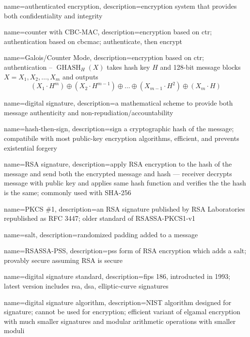 {
    name={authenticated encryption},
    description={encryption system that provides both \gls{confidentiality} and \gls{integrity}}
}

{
    name={counter with CBC-MAC},
    description={encryption based on \acrfull{ctr}; authentication based on \gls{cbcmac}; authenticate, then encrypt}
}

{
    name={Galois/Counter Mode},
    description={encryption based on \acrfull{ctr}; authentication -- $\operatorname{GHASH}_H(X)$ takes hash key $H$ and 128-bit message blocks $X = X_1, X_2, \dots, X_m$ and outputs \[(X_1\cdot H^m)\oplus(X_2\cdot H^{m-1})\oplus\dots\oplus(X_{m-1}\cdot H^2)\oplus(X_m\cdot H)\]}
}

{
    name={digital signature},
    description={a mathematical scheme to provide both message \gls{authenticity} and \gls{non-repudiation}/\gls{accountability}}
}

{
    name={hash-then-sign},
    description={sign a cryptographic hash of the message; compatibile with most public-key encryption algorithms, efficient, and prevents existential forgery}
}

{
    name={RSA signature},
    description={apply RSA encryption to the hash of the message and send both the encrypted message and hash --- receiver decrypts message with public key and applies same hash function and verifies the the hash is the same; commonly used with SHA-256}
}

{
    name={PKCS \#1},
    description={an RSA signature published by RSA Laboratories republished as RFC 3447; older standard of RSASSA-PKCS1-v1}
}

{
    name={salt},
    description={randomized padding added to a message}
}

{
    name={RSASSA-PSS},
    description={\acrfull{pss} form of RSA encryption which adds a \gls{salt}; provably secure assuming RSA is secure}
}

{
    name={digital signature standard},
    description={\acrfull{fips} 186, introducted in 1993; latest version includes \acrshort{rsa}, \acrshort{dsa}, elliptic-curve signatures}
}

{
    name={digital signature algorithm},
    description={NIST algorithm designed for signature; cannot be used for encryption; efficient variant of \gls{elgamal encryption} with much smaller signatures and modular arithmetic operations with smaller moduli}
}

